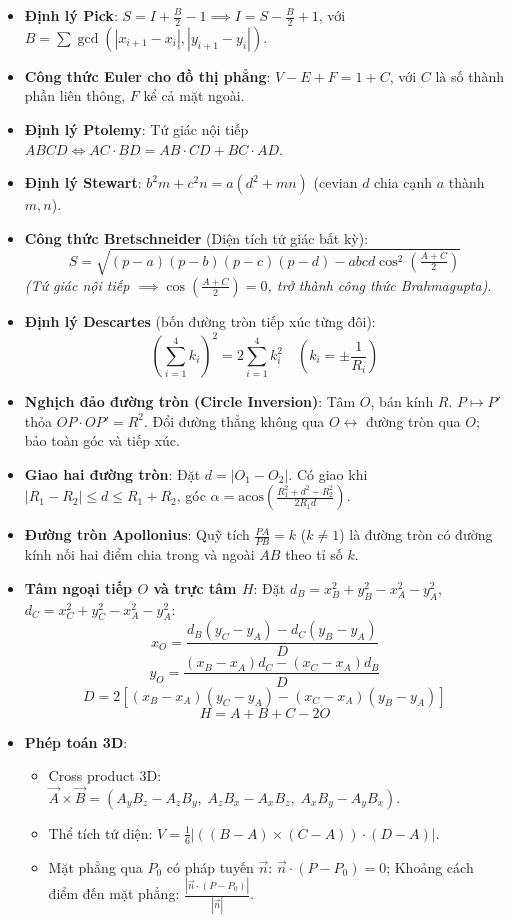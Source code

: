 \begin{itemize}
\begin{itemize}
    \end{itemize}
    \item \textbf{Định lý Pick}: $S = I + \frac{B}{2} - 1 \implies I = S - \frac{B}{2} + 1$, với $B = \sum \gcd(|x_{i+1} - x_i|, |y_{i+1} - y_i|)$.
    \item \textbf{Công thức Euler cho đồ thị phẳng}: $V-E+F=1+C$, với $C$ là số thành phần liên thông, $F$ kể cả mặt ngoài.
    \item \textbf{Định lý Ptolemy}: Tứ giác nội tiếp $ABCD \iff AC \cdot BD = AB \cdot CD + BC \cdot AD$.
    \item \textbf{Định lý Stewart}: $b^2m + c^2n = a(d^2 + mn)$ (cevian $d$ chia cạnh $a$ thành $m, n$).
    \item \textbf{Công thức Bretschneider} (Diện tích tứ giác bất kỳ):
    $$ S = \sqrt{(p-a)(p-b)(p-c)(p-d) - abcd \cos^2\left(\tfrac{A+C}{2}\right)} $$
    \textit{(Tứ giác nội tiếp $\implies \cos(\frac{A+C}{2}) = 0$, trở thành công thức Brahmagupta)}.
    \item \textbf{Định lý Descartes} (bốn đường tròn tiếp xúc từng đôi):
    $$ \left(\sum_{i=1}^4 k_i\right)^2 = 2 \sum_{i=1}^4 k_i^2 \quad \left(k_i = \pm \frac{1}{R_i}\right) $$
    \item \textbf{Nghịch đảo đường tròn (Circle Inversion)}: Tâm $O$, bán kính $R$. $P \mapsto P'$ thỏa $OP \cdot OP' = R^2$. Đổi đường thẳng không qua $O \longleftrightarrow$ đường tròn qua $O$; bảo toàn góc và tiếp xúc.
    \item \textbf{Giao hai đường tròn}: Đặt $d = |O_1 - O_2|$. Có giao khi $|R_1 - R_2| \le d \le R_1 + R_2$, góc $\alpha = \text{acos}\left(\frac{R_1^2 + d^2 - R_2^2}{2 R_1 d}\right)$.
    \item \textbf{Đường tròn Apollonius}: Quỹ tích $\frac{PA}{PB} = k$ ($k \ne 1$) là đường tròn có đường kính nối hai điểm chia trong và ngoài $AB$ theo tỉ số $k$.
    \item \textbf{Tâm ngoại tiếp $O$ và trực tâm $H$}: Đặt $d_B = x_B^2+y_B^2-x_A^2-y_A^2$, $d_C = x_C^2+y_C^2-x_A^2-y_A^2$:
    $$x_O = \frac{d_B (y_C - y_A) - d_C (y_B - y_A)}{D}$$
    $$y_O = \frac{(x_B - x_A) d_C - (x_C - x_A) d_B}{D}$$
    $$D = 2 \left[ (x_B - x_A)(y_C - y_A) - (x_C - x_A)(y_B - y_A) \right]$$
    $$H = A + B + C - 2O$$

    \item \textbf{Phép toán 3D}:
    \begin{itemize}
        \item Cross product 3D: $\vec{A} \times \vec{B} = (A_y B_z - A_z B_y, \; A_z B_x - A_x B_z, \; A_x B_y - A_y B_x)$.
        \item Thể tích tứ diện: $V = \frac{1}{6} \left| ((B - A) \times (C - A)) \cdot (D - A) \right|$.
        \item Mặt phẳng qua $P_0$ có pháp tuyến $\vec{n}$: $\vec{n} \cdot (P - P_0) = 0$; Khoảng cách điểm đến mặt phẳng: $\frac{|\vec{n} \cdot (P - P_0)|}{|\vec{n}|}$.
    \end{itemize}
\end{itemize}

